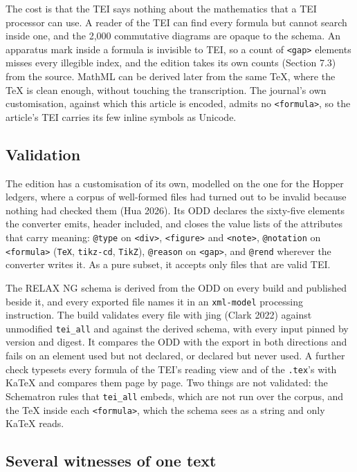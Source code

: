 \documentclass[11pt]{article}
\begin{document}
The cost is that the TEI says nothing about the mathematics that a TEI processor can use. A reader of the TEI can find every formula but cannot search inside one, and the 2,000 commutative diagrams are opaque to the schema. An apparatus mark inside a formula is invisible to TEI, so a count of \texttt{<gap>} elements misses every illegible index, and the edition takes its own counts (Section 7.3) from the source. MathML can be derived later from the same TeX, where the TeX is clean enough, without touching the transcription. The journal's own customisation, against which this article is encoded, admits no \texttt{<formula>}, so the article's TEI carries its few inline symbols as Unicode.

\subsection{Validation}

The edition has a customisation of its own, modelled on the one for the Hopper ledgers, where a corpus of well-formed files had turned out to be invalid because nothing had checked them (Hua 2026). Its ODD declares the sixty-five elements the converter emits, header included, and closes the value lists of the attributes that carry meaning: \texttt{@type} on \texttt{<div>}, \texttt{<figure>} and \texttt{<note>}, \texttt{@notation} on \texttt{<formula>} (\texttt{TeX}, \texttt{tikz-cd}, \texttt{TikZ}), \texttt{@reason} on \texttt{<gap>}, and \texttt{@rend} wherever the converter writes it. As a pure subset, it accepts only files that are valid TEI.

The RELAX NG schema is derived from the ODD on every build and published beside it, and every exported file names it in an \texttt{xml-model} processing instruction. The build validates every file with jing (Clark 2022) against unmodified \texttt{tei\_all} and against the derived schema, with every input pinned by version and digest. It compares the ODD with the export in both directions and fails on an element used but not declared, or declared but never used. A further check typesets every formula of the TEI's reading view and of the \texttt{.tex}'s with KaTeX and compares them page by page. Two things are not validated: the Schematron rules that \texttt{tei\_all} embeds, which are not run over the corpus, and the TeX inside each \texttt{<formula>}, which the schema sees as a string and only KaTeX reads.

\subsection{Several witnesses of one text}
\end{document}
